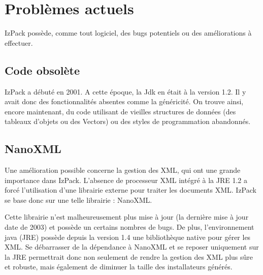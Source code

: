 \section{Problèmes actuels}
IzPack possède, comme tout logiciel, des bugs potentiels ou des améliorations à effectuer.
\subsection{Code obsolète}
IzPack a débuté en 2001.
A cette époque, la Jdk en était à la version 1.2. Il y avait donc des fonctionnalités absentes comme la généricité.
On trouve ainsi, encore maintenant, du code utilisant de vieilles structures de données (des tableaux d'objets ou des Vectors) ou des styles de programmation abandonnés.
\subsection{NanoXML}
Une amélioration possible concerne la gestion des XML, qui ont une grande importance dans IzPack.
L'absence de processeur XML intégré à la JRE 1.2 a forcé l'utilisation d'une librairie externe pour traiter les documents XML.
IzPack se base donc sur une telle librairie : NanoXML.

Cette librairie n'est malheureusement plus mise à jour (la dernière mise à jour date de 2003) et possède un certains nombres de bugs.
De plus, l'environnement java (JRE) possède depuis la version 1.4 une bibliothèque native pour gérer les XML.
Se débarrasser de la dépendance à NanoXML et se reposer uniquement sur la JRE permettrait donc non seulement de rendre la gestion des XML plus sûre et robuste, mais également de diminuer la taille des installateurs générés.